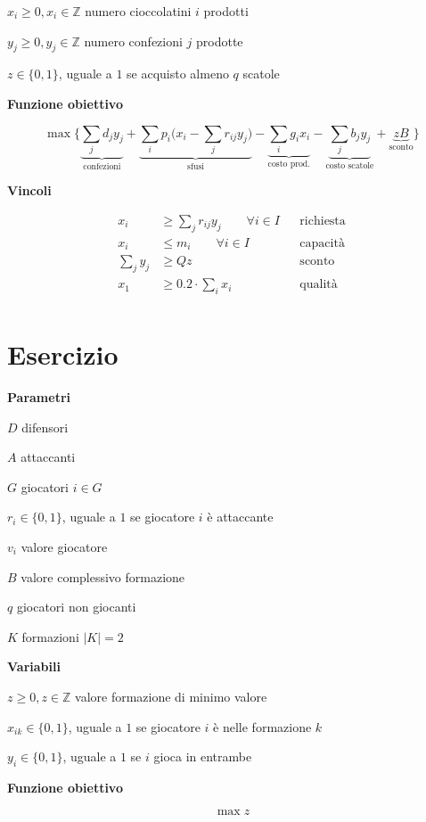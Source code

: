 \documentclass[10pt,a4paper,twoside,openright]{book}
\newcounter{es}
\newcommand{\Es}{
	\stepcounter{es}
	\section{Esercizio \arabic{es}}
	}
\numberwithin{es}{chapter}
\newcommand{\Par}{\textbf{Parametri}}
\newcommand{\Var}{\textbf{Variabili}}
\newcommand{\Fob}{\textbf{Funzione obiettivo}}
\newcommand{\Vin}{\textbf{Vincoli}}
\begin{document}
$x_{i} \geq 0,x_{i} \in \mathbb{Z}$ numero cioccolatini $i$ prodotti

$y_{j} \geq 0,y_{j} \in \mathbb{Z}$ numero confezioni $j$ prodotte

$z\in \{0,1\}$, uguale a $1$ se acquisto almeno $q$ scatole

\Fob

\begin{equation*}
	\max\bigg\{\underbrace{\sum _{j} d_{j} y_{j}}_{\text{confezioni}} +\underbrace{\sum _{i} p_{i}\bigg( x_{i} -\sum _{j} r_{ij} y_{j}\bigg)}_{\text{sfusi}} -\underbrace{\sum _{i} g_{i} x_{i}}_{\text{costo prod.}} -\underbrace{\sum _{j} b_{j} y_{j}}_{\text{costo scatole}} +\underbrace{zB}_{\text{sconto}}\bigg\}
\end{equation*}

\Vin

\begin{align*}
	x_{i} & \geq \sum _{j} r_{ij} y_{j} \qquad\forall i\in I && \text{richiesta} \\
	x_{i} & \leq m_{i} \qquad\forall i\in I && \text{capacità} \\
	\sum _{j} y_{j} & \geq Qz && \text{sconto} \\
	x_{1} & \geq 0.2\cdot \sum _{i} x_{i} && \text{qualità} \\
\end{align*}

\Es

\Par

$D$ difensori

$A$ attaccanti

$G$ giocatori $i\in G$

$r_{i} \in \{0,1\}$, uguale a $1$ se giocatore $i$ è attaccante

$v_{i}$ valore giocatore

$B$ valore complessivo formazione

$q$ giocatori non giocanti

$K$ formazioni $|K|=2$

\Var

$z\geq 0,z\in \mathbb{Z}$ valore formazione di minimo valore

$x_{ik} \in \{0,1\}$, uguale a $1$ se giocatore $i$ è nelle formazione $k$

$y_{i} \in \{0,1\}$, uguale a $1$ se $i$ gioca in entrambe

\Fob

\begin{equation*}
	\max z
\end{equation*}
\end{document}
